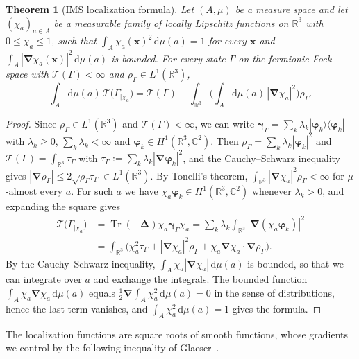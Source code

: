 \documentclass[final,reqno]{amsart}
\newtheorem{theorem}{Theorem}[section]
\theoremstyle{remark}
\renewcommand{\le}{\leqslant}
\renewcommand{\ge}{\geqslant}
\let\phi=\varphi
\DeclareMathOperator{\Tr}{Tr}
\newcommand{\RR}{\mathbb{R}}
\newcommand{\CC}{\mathbb{C}}
\newcommand{\lapl}{\bm{\Delta}}
\newcommand{\grad}{\bm{\nabla}}
\newcommand{\dd}{\mathrm{d}}
\newcommand{\TC}{\mathcal{T}}
\begin{document}
\begin{theorem}[IMS localization formula]\label{thm:IMS}
Let $(A,\mu)$ be a measure space and let $(\chi_a)_{a\in A}$ be a measurable family of locally Lipschitz functions on $\RR^3$ with $0\le\chi_a\le1$, such that $\int_A\chi_a(\mathbf{x})^2\,\dd\mu(a)=1$ for every $\mathbf{x}$ and $\int_A|\grad\chi_a(\mathbf{x})|^2\,\dd\mu(a)$ is bounded. For every state $\Gamma$ on the fermionic Fock space with $\TC(\Gamma)<\infty$ and $\rho_\Gamma\in L^1(\RR^3)$,
\begin{equation*}
\int_A\dd\mu(a)\,\TC\big(\Gamma_{|\chi_a}\big)=\TC(\Gamma)+\int_{\RR^3}\bigg(\int_A\dd\mu(a)\,|\grad\chi_a|^2\bigg)\rho_\Gamma.
\end{equation*}
\end{theorem}

\begin{proof}
Since $\rho_\Gamma\in L^1(\RR^3)$ and $\TC(\Gamma)<\infty$, we can write $\bm{\gamma}_\Gamma=\sum_k\lambda_k|\bm{\phi}_k\rangle\langle\bm{\phi}_k|$ with $\lambda_k\ge0$, $\sum_k\lambda_k<\infty$ and $\bm{\phi}_k\in H^1(\RR^3,\CC^2)$. Then $\rho_\Gamma=\sum_k\lambda_k|\bm{\phi}_k|^2$ and $\TC(\Gamma)=\int_{\RR^3}\tau_\Gamma$ with $\tau_\Gamma:=\sum_k\lambda_k|\grad\bm{\phi}_k|^2$, and the Cauchy--Schwarz inequality gives $|\grad\rho_\Gamma|\le2\sqrt{\rho_\Gamma\tau_\Gamma}\in L^1(\RR^3)$. By Tonelli's theorem, $\int_{\RR^3}|\grad\chi_a|^2\rho_\Gamma<\infty$ for $\mu$-almost every $a$. For such $a$ we have $\chi_a\bm{\phi}_k\in H^1(\RR^3,\CC^2)$ whenever $\lambda_k>0$, and expanding the square gives
\begin{align*}
\TC\big(\Gamma_{|\chi_a}\big)&=\Tr(-\lapl)\chi_a\bm{\gamma}_\Gamma\chi_a=\sum_k\lambda_k\int_{\RR^3}|\grad(\chi_a\bm{\phi}_k)|^2\\
&=\int_{\RR^3}\Big(\chi_a^2\tau_\Gamma+|\grad\chi_a|^2\rho_\Gamma+\chi_a\grad\chi_a\cdot\grad\rho_\Gamma\Big).
\end{align*}
By the Cauchy--Schwarz inequality, $\int_A\chi_a|\grad\chi_a|\,\dd\mu(a)$ is bounded, so that we can integrate over $a$ and exchange the integrals. The bounded function $\int_A\chi_a\grad\chi_a\,\dd\mu(a)$ equals $\frac12\grad\int_A\chi_a^2\,\dd\mu(a)=0$ in the sense of distributions, hence the last term vanishes, and $\int_A\chi_a^2\,\dd\mu(a)=1$ gives the formula.
\end{proof}

The localization functions are square roots of smooth functions, whose gradients we control by the following inequality of Glaeser~\cite{glaeser1963racine}.
\end{document}
